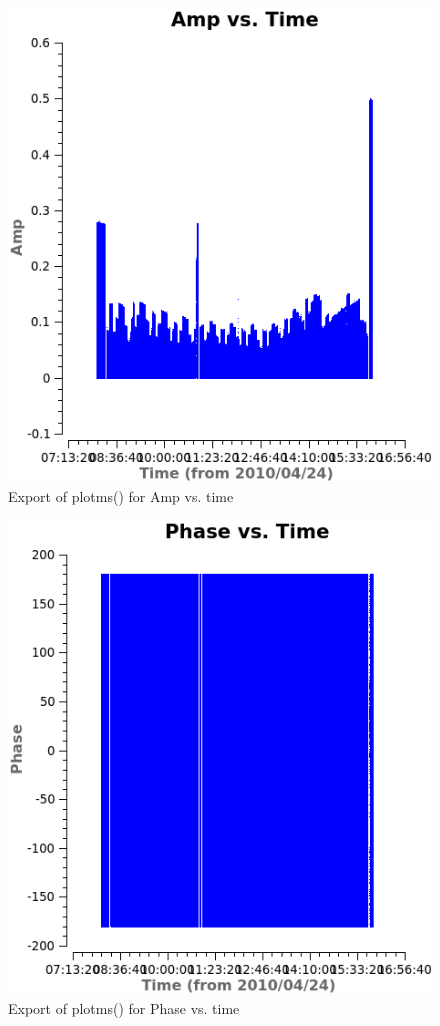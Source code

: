 \documentclass[12pt, a4paper]{article}
\begin{document}
\newpage

\begin{figure}[h!]
    \centering
    \includegraphics[scale=0.65]{../Imaging/plots/amp_vs_time_vraag14-1.png}
    \caption{Export of plotms() for Amp vs. time \label{fig:14-1}}
\end{figure}

\begin{figure}[h!]
    \centering
    \includegraphics[scale=0.65]{../Imaging/plots/phase_vs_time_vraag14-2.png}
    \caption{Export of plotms() for Phase vs. time \label{fig:14-2}}
\end{figure}
\end{document}
